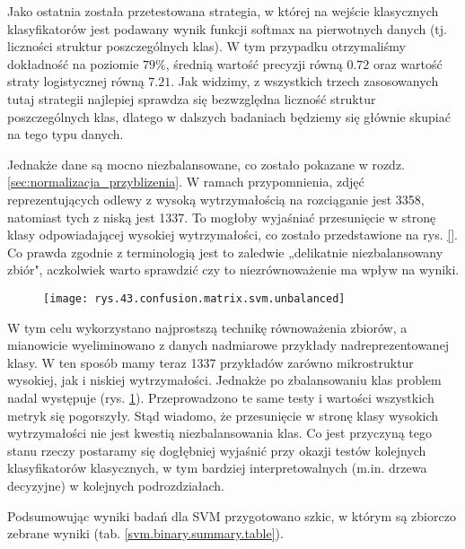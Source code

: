 Jako ostatnia została przetestowana strategia, w której na wejście klasycznych klasyfikatorów jest podawany wynik funkcji softmax na pierwotnych danych (tj. liczności struktur poszczególnych klas). W tym przypadku otrzymaliśmy dokładność na poziomie $79\%$, średnią wartość precyzji równą $0.72$ oraz wartość straty logistycznej równą $7.21$. Jak widzimy, z wszystkich trzech zasosowanych tutaj strategii najlepiej sprawdza się bezwzględna liczność struktur poszczególnych klas, dlatego w dalszych badaniach będziemy się głównie skupiać na tego typu danych. 


Jednakże dane są mocno niezbalansowane, co zostało pokazane w rozdz. \ref{sec:normalizacja_przyblizenia}. W ramach przypomnienia, zdjęć reprezentujących odlewy z wysoką wytrzymałością na rozciąganie jest 3358, natomiast tych z niską jest 1337. To mogłoby wyjaśniać przesunięcie w stronę klasy odpowiadającej wysokiej wytrzymałości, co zostało przedstawione na rys. \ref{}. Co prawda zgodnie z terminologią jest to zaledwie „delikatnie niezbalansowany zbiór", aczkolwiek warto sprawdzić czy to niezrównoważenie ma wpływ na wyniki.
\begin{figure}[h]
    \centering
    \texttt{[image: rys.43.confusion.matrix.svm.unbalanced]}
    \caption{}
    \label{rys.43.confusion.matrix.svm.unbalanced}
\end{figure}
W tym celu wykorzystano najprostszą technikę równoważenia zbiorów, a mianowicie wyeliminowano z danych nadmiarowe przykłady nadreprezentowanej klasy. W ten sposób mamy teraz 1337 przykładów zarówno mikrostruktur wysokiej, jak i niskiej wytrzymałości. Jednakże po zbalansowaniu klas problem nadal występuje (rys. \ref{rys.43.confusion.matrix.svm.unbalanced}). Przeprowadzono te same testy i wartości wszystkich metryk się pogorszyły. Stąd wiadomo, że przesunięcie w stronę klasy wysokich wytrzymałości nie jest kwestią niezbalansowania klas. Co jest przyczyną tego stanu rzeczy postaramy się dogłębniej wyjaśnić przy okazji testów kolejnych klasyfikatorów klasycznych, w tym bardziej interpretowalnych (m.in. drzewa decyzyjne) w kolejnych podrozdziałach.

Podsumowując wyniki badań dla SVM przygotowano szkic, w którym są zbiorczo zebrane wyniki (tab. \ref{svm.binary.summary.table}). 

